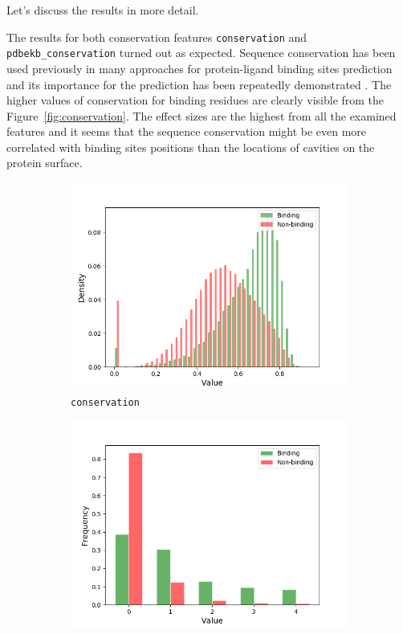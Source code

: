 Let's discuss the results in more detail.

The results for both conservation features \texttt{conservation} and \texttt{pdbekb\_conservation} turned out as expected. Sequence conservation has been used previously in many approaches for protein-ligand binding sites prediction and its importance for the prediction has been repeatedly demonstrated \cite{ligsite, cons, casp, prankweb}. The higher values of conservation for binding residues are clearly visible from the Figure~\ref{fig:conservation}. The effect sizes are the highest from all the examined features and it seems that the sequence conservation might be even more correlated with binding sites positions than the locations of cavities on the protein surface.

\begin{figure}[!htbp]
\centering
\begin{subfigure}{.5\textwidth}
  \centering
  \includegraphics[width=1\linewidth]{../img/conservation_hist.png}
  \caption{\texttt{conservation}}
\end{subfigure}%
\begin{subfigure}{.5\textwidth}
  \centering
  \includegraphics[width=1\linewidth]{../img/pdbekb_conservation_frequencies.png}

\end{subfigure}
\end{figure}
